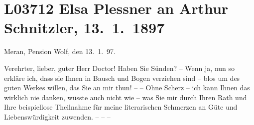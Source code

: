 

\section[Elsa Plessner an Arthur Schnitzler, 13. 1. 1897]{L03712 Elsa Plessner an Arthur Schnitzler, 13. 1. 1897}
\nopagebreak{}
\rehead{ }\normalsize\beginnumbering{}
\toendnotes[C]{\smallbreak\pagebreak[2]}
\toendnotes[C]{\smallbreak}
\toendnotes[C]{\smallbreak}
\pstart
           {\pb}Meran, Pension Wolf, den
                     13. 1. 97.\pend
           
\pstart{}Verehrter, lieber, guter Herr Doctor!\pend\vspace{0.5em}
\pstart
           Haben Sie Sünden? – Wenn ja, nun so erkläre ich, dass sie Ihnen in Bausch und Bogen
               verziehen sind – blos um des guten Werkes willen, das Sie an mir thun! – – Ohne
               Scherz – ich kann Ihnen das wirklich nie danken, wüsste auch nicht wie – was Sie mir
               durch Ihren Rath und Ihre beispiellose Theilnahme für meine literarischen Schmerzen
               an Güte und Liebenswürdigkeit zuwenden. – – – \pend
           
